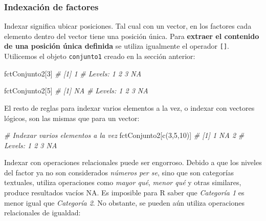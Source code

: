 \documentclass[
]{article}
\newenvironment{Shaded}{\begin{snugshade}}{\end{snugshade}}
\newcommand{\CommentTok}[1]{\textcolor[rgb]{0.56,0.35,0.01}{\textit{#1}}}
\newcommand{\DecValTok}[1]{\textcolor[rgb]{0.00,0.00,0.81}{#1}}
\newcommand{\FunctionTok}[1]{\textcolor[rgb]{0.00,0.00,0.00}{#1}}
\newcommand{\NormalTok}[1]{#1}
\theoremstyle{definition}
\theoremstyle{definition}
\theoremstyle{definition}
\theoremstyle{definition}
\theoremstyle{remark}
\begin{document}
\hypertarget{indexaciuxf3n-de-factores}{%
\subsubsection{Indexación de factores}\label{indexaciuxf3n-de-factores}}

Indexar significa ubicar posiciones. Tal cual con un vector, en los factores cada elemento dentro del vector tiene una posición única. Para \textbf{extraer el contenido de una posición única definida} se utiliza igualmente el operador \texttt{{[}{]}}. Utilicemos el objeto \texttt{conjunto1} creado en la sección anterior:

\begin{Shaded}
\begin{Highlighting}[]
\NormalTok{fctConjunto2[}\DecValTok{3}\NormalTok{]}
\CommentTok{\# [1] 1}
\CommentTok{\# Levels: 1 2 3 NA}

\NormalTok{fctConjunto2[}\DecValTok{5}\NormalTok{]}
\CommentTok{\# [1] NA}
\CommentTok{\# Levels: 1 2 3 NA}
\end{Highlighting}
\end{Shaded}

El resto de reglas para indexar varios elementos a la vez, o indexar con vectores lógicos, son las mismas que para un vector:

\begin{Shaded}
\begin{Highlighting}[]
\CommentTok{\# Indexar varios elementos a la vez}
\NormalTok{fctConjunto2[}\FunctionTok{c}\NormalTok{(}\DecValTok{3}\NormalTok{,}\DecValTok{5}\NormalTok{,}\DecValTok{10}\NormalTok{)]}
\CommentTok{\# [1] 1  NA 2 }
\CommentTok{\# Levels: 1 2 3 NA}
\end{Highlighting}
\end{Shaded}

Indexar con operaciones relacionales puede ser engorroso. Debido a que los niveles del factor ya no son considerados \emph{números per se}, sino que son categorías textuales, utiliza operaciones como \emph{mayor qué}, \emph{menor qué} y otras similares, produce resultados vacíos NA. Es imposible para R saber que \emph{Categoría 1} es menor igual que \emph{Categoría 2}. No obstante, se pueden aún utiliza operaciones relacionales de igualdad:
\end{document}

